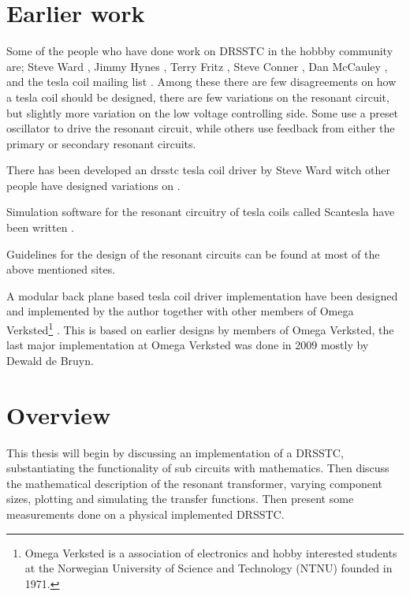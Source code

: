 \section{Earlier work}
Some of the people who have done work on DRSSTC in the hobbby community are; Steve Ward , Jimmy Hynes , Terry Fritz , Steve Conner , Dan McCauley , and the tesla coil mailing list . Among these there are few disagreements on how a tesla coil should be designed, there are few variations on the resonant circuit, but slightly more variation on the low voltage controlling side. Some use a preset oscillator to drive the resonant circuit, while others use feedback from either the primary or secondary resonant circuits.

There has been developed an drsstc tesla coil driver by Steve Ward witch other people have designed variations on .

Simulation software for the resonant circuitry of tesla coils called Scantesla have been written .

Guidelines for the design of the resonant circuits can be found at most of the above mentioned sites.

A modular back plane based tesla coil driver implementation have been designed and implemented by the author together with other members of Omega Verksted\footnote{Omega Verksted is a association of electronics and hobby interested students at the Norwegian University of Science and Technology (NTNU) founded in 1971.} \citep{prosjektoppgave} \citep{githubtesla}. This is based on earlier designs by members of Omega Verksted, the last major implementation at Omega Verksted was done in 2009 mostly by Dewald de Bruyn.



\section{Overview}
This thesis will begin by discussing an implementation of a DRSSTC, substantiating the functionality of sub circuits with mathematics. Then discuss the mathematical description of the resonant transformer, varying component sizes, plotting and simulating the transfer functions. Then present some measurements done on a physical implemented DRSSTC.